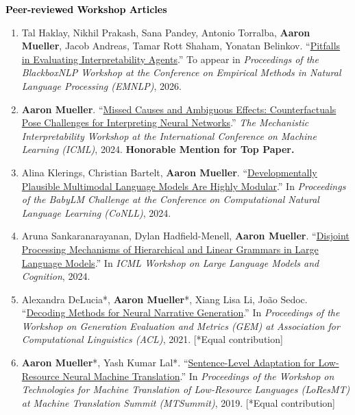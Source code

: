 \documentclass[10pt]{article}
\renewcommand{\subsection}[1]{\textcolor{black}{#1}}
\providecommand*\titlelink[2]{\href{#1}{\textcolor{accent}{#2}}}
\begin{document}
	\subsection{\textbf{Peer-reviewed Workshop Articles}}
	\begin{enumerate}[leftmargin=*, topsep=0pt, itemsep=0.25ex, partopsep=0ex, parsep=1ex, label=W\arabic*., ref=W\arabic*]

	\item Tal Haklay, Nikhil Prakash, Sana Pandey, Antonio Torralba, \textbf{Aaron Mueller}, Jacob Andreas, Tamar Rott Shaham, Yonatan Belinkov. ``\titlelink{https://arxiv.org/abs/2603.20101}{Pitfalls in Evaluating Interpretability Agents}.'' To appear in \emph{Proceedings of the BlackboxNLP Workshop at the Conference on Empirical Methods in Natural Language Processing (EMNLP)}, 2026.
		
	\item \textbf{Aaron Mueller}. ``\titlelink{https://arxiv.org/abs/2407.04690v1}{Missed Causes and Ambiguous Effects: Counterfactuals Pose Challenges for Interpreting Neural Networks}.'' \emph{The Mechanistic Interpretability Workshop at the International Conference on Machine Learning (ICML)}, 2024. \textbf{\textcolor{accent}{Honorable Mention for Top Paper.}}\label{pub:missed-causes}
	
	\item Alina Klerings, Christian Bartelt, \textbf{Aaron Mueller}. ``\titlelink{https://aclanthology.org/2024.conll-babylm.10/}{Developmentally Plausible Multimodal Language Models Are Highly Modular}.'' In \emph{Proceedings of the BabyLM Challenge at the Conference on Computational Natural Language Learning (CoNLL)}, 2024.\label{pub:modular-babylm}

	\item Aruna Sankaranarayanan, Dylan Hadfield-Menell, \textbf{Aaron Mueller}. ``\titlelink{https://openreview.net/forum?id=qg2TJ3eKOr}{Disjoint Processing Mechanisms of Hierarchical and Linear Grammars in Large Language Models}.'' In \emph{ICML Workshop on Large Language Models and Cognition}, 2024.\label{pub:disjoint-mechanisms}

	\item Alexandra DeLucia*, \textbf{Aaron Mueller}*, Xiang Lisa Li, João Sedoc. ``\titlelink{https://aclanthology.org/2021.gem-1.16/}{Decoding Methods for Neural Narrative Generation}.'' In \emph{Proceedings of the Workshop on Generation Evaluation and Metrics (GEM) at Association for Computational Linguistics (ACL)}, 2021. [*Equal contribution]\label{pub:decoding-methods}

	\item \textbf{Aaron Mueller}*, Yash Kumar Lal*. ``\titlelink{https://aclanthology.org/W19-6807/}{Sentence-Level Adaptation for Low-Resource Neural Machine Translation}.'' In \emph{Proceedings of the Workshop on Technologies for Machine Translation of Low-Resource Languages (LoResMT) at Machine Translation Summit (MTSummit)}, 2019. [*Equal contribution]\label{pub:sent-level}
	
	\end{enumerate}
\end{document}
